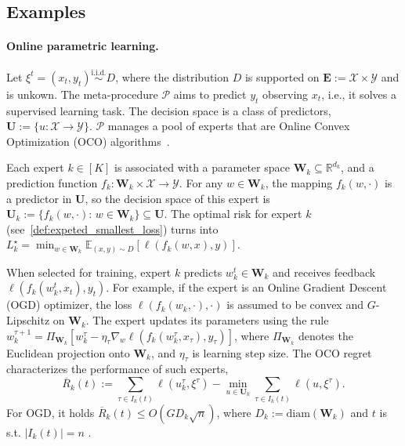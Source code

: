 \documentclass[a4paper,14pt]{extarticle}
\theoremstyle{plain}
\begin{document}
\subsection{Examples}
\label{sec:examples}
\paragraph{Online parametric learning.} Let $\xi^t=(x_t,y_t) \overset{\mathrm{i.i.d.}}{\sim} D$, where the distribution $D$ is supported on $\mathbf{E} :=\mathcal X \times \mathcal Y$ and is unkown. The meta-procedure $\mathcal P$ aims to predict $y_t$ observing $x_t$, i.e., it solves a supervised learning task. The decision space is a class of predictors, $\mathbf{U} := \{u: \mathcal X \to \mathcal Y\}$.
$\mathcal P$ manages a pool of experts that are Online Convex Optimization (OCO) algorithms~\cite{hazan2016introduction}.

Each expert $k \in [K]$ is associated with a parameter space $\mathbf W_k \subseteq \mathbb R^{d_k}$, and a prediction function $f_k: \mathbf W_k \times \mathcal X \to \mathcal Y$. For any $w \in \mathbf W_k$, the mapping $f_k(w, \cdot)$ is a predictor in $\mathbf U$, so the decision space of this expert is $\mathbf U_k := \{f_k(w, \cdot):\, w \in \mathbf W_k\} \subseteq \mathbf U.$
The optimal risk for expert $k$ (see~\eqref{def:expeted_smallest_loss}) turns into $L_k^\star = \min_{w \in \mathbf W_k} \mathbb E_{(x, y) \sim D} [\ell(f_k(w, x), y)]$.

When selected for training, expert $k$ predicts $w^t_k \in \mathbf{W}_k$ and receives feedback $\ell(f_k(w^t_k, x_t), y_t)$. For example, if the expert is an Online Gradient Descent (OGD) optimizer, the loss $\ell(f_k(w_k, \cdot), \cdot)$ is assumed to be convex and $G$-Lipschitz on $\mathbf{W}_k$. The expert updates its parameters using the rule $w_k^{\tau+1} = \Pi_{\mathbf{W}_k} [w_k^{\tau} - \eta_{\tau} \nabla_{w} \ell(f_k(w_k^\tau, x_\tau), y_\tau)]$, where $\Pi_{\mathbf{W}_k}$ denotes the Euclidean projection onto $\mathbf{W}_k$, and $\eta_{\tau}$ is learning step size. The OCO regret characterizes the performance of such experts,
\begin{equation}
\label{eq:regret_oco}
\overline{R}_k(t) := \sum_{\tau \in I_k(t)} \ell(u_k^\tau, \xi^\tau) - \min_{u \in \mathbf{U}_k} \sum_{\tau \in I_k(t)} \ell(u, \xi^\tau).
\end{equation}
For OGD, it holds $\overline{R}_k(t) \leq O(GD_k\sqrt{n})$, where
$D_k := \mathrm{diam}(\mathbf{W}_k)$ and $t$ is s.t. $|I_{k}(t)| = n$ \cite{hazan2016introduction}.
\end{document}
